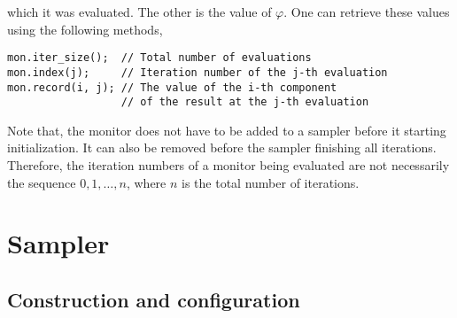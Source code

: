 which it was evaluated. The other is the value of $\varphi$. One can retrieve
these values using the following methods,
\begin{verbatim}
mon.iter_size();  // Total number of evaluations
mon.index(j);     // Iteration number of the j-th evaluation
mon.record(i, j); // The value of the i-th component
                  // of the result at the j-th evaluation
\end{verbatim}
Note that, the monitor does not have to be added to a sampler before it
starting initialization. It can also be removed before the sampler finishing
all iterations. Therefore, the iteration numbers of a monitor being evaluated
are not necessarily the sequence $0,1,\dots,n$, where $n$ is the total number
of iterations.

\section{Sampler}
\label{sec:Sampler}

\subsection{Construction and configuration}
\label{sec:Construction and configuration}

